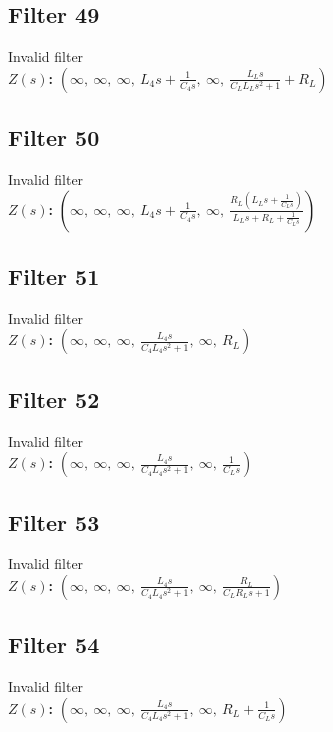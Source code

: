 \documentclass{article}
\begin{document}
\subsection*{Filter 49}
Invalid filter \\ 
\textbf{$Z(s)$:} $\left( \infty, \  \infty, \  \infty, \  L_{4} s + \frac{1}{C_{4} s}, \  \infty, \  \frac{L_{L} s}{C_{L} L_{L} s^{2} + 1} + R_{L}\right)$ \\ 
\subsection*{Filter 50}
Invalid filter \\ 
\textbf{$Z(s)$:} $\left( \infty, \  \infty, \  \infty, \  L_{4} s + \frac{1}{C_{4} s}, \  \infty, \  \frac{R_{L} \left(L_{L} s + \frac{1}{C_{L} s}\right)}{L_{L} s + R_{L} + \frac{1}{C_{L} s}}\right)$ \\ 
\subsection*{Filter 51}
Invalid filter \\ 
\textbf{$Z(s)$:} $\left( \infty, \  \infty, \  \infty, \  \frac{L_{4} s}{C_{4} L_{4} s^{2} + 1}, \  \infty, \  R_{L}\right)$ \\ 
\subsection*{Filter 52}
Invalid filter \\ 
\textbf{$Z(s)$:} $\left( \infty, \  \infty, \  \infty, \  \frac{L_{4} s}{C_{4} L_{4} s^{2} + 1}, \  \infty, \  \frac{1}{C_{L} s}\right)$ \\ 
\subsection*{Filter 53}
Invalid filter \\ 
\textbf{$Z(s)$:} $\left( \infty, \  \infty, \  \infty, \  \frac{L_{4} s}{C_{4} L_{4} s^{2} + 1}, \  \infty, \  \frac{R_{L}}{C_{L} R_{L} s + 1}\right)$ \\ 
\subsection*{Filter 54}
Invalid filter \\ 
\textbf{$Z(s)$:} $\left( \infty, \  \infty, \  \infty, \  \frac{L_{4} s}{C_{4} L_{4} s^{2} + 1}, \  \infty, \  R_{L} + \frac{1}{C_{L} s}\right)$ \\ 
\end{document}
